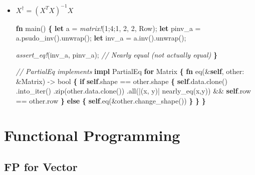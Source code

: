 \documentclass[]{book}
\newenvironment{Shaded}{\begin{snugshade}}{\end{snugshade}}
\newcommand{\BuiltInTok}[1]{#1}
\newcommand{\CommentTok}[1]{\textcolor[rgb]{0.56,0.35,0.01}{\textit{#1}}}
\newcommand{\DataTypeTok}[1]{\textcolor[rgb]{0.13,0.29,0.53}{#1}}
\newcommand{\DecValTok}[1]{\textcolor[rgb]{0.00,0.00,0.81}{#1}}
\newcommand{\KeywordTok}[1]{\textcolor[rgb]{0.13,0.29,0.53}{\textbf{#1}}}
\newcommand{\NormalTok}[1]{#1}
\newcommand{\OperatorTok}[1]{\textcolor[rgb]{0.81,0.36,0.00}{\textbf{#1}}}
\newcommand{\PreprocessorTok}[1]{\textcolor[rgb]{0.56,0.35,0.01}{\textit{#1}}}
\begin{document}
\begin{itemize}
\item
  \(X^\dagger = \left(X^T X\right)^{-1} X\)

\begin{Shaded}
\begin{Highlighting}[]
\KeywordTok{fn}\NormalTok{ main() }\OperatorTok{\{}
    \KeywordTok{let}\NormalTok{ a = }\PreprocessorTok{matrix!}\NormalTok{(}\DecValTok{1}\NormalTok{;}\DecValTok{4}\NormalTok{;}\DecValTok{1}\NormalTok{, }\DecValTok{2}\NormalTok{, }\DecValTok{2}\NormalTok{, Row);}
    \KeywordTok{let}\NormalTok{ pinv_a = a.psudo_inv().unwrap();}
    \KeywordTok{let}\NormalTok{ inv_a = a.inv().unwrap();}

    \PreprocessorTok{assert_eq!}\NormalTok{(inv_a, pinv_a); }\CommentTok{// Nearly equal (not actually equal)}
\OperatorTok{\}}

\CommentTok{// PartialEq implements}
\KeywordTok{impl} \BuiltInTok{PartialEq} \KeywordTok{for}\NormalTok{ Matrix }\OperatorTok{\{}
    \KeywordTok{fn}\NormalTok{ eq(&}\KeywordTok{self}\NormalTok{, other: &Matrix) -> }\DataTypeTok{bool} \OperatorTok{\{}
        \KeywordTok{if} \KeywordTok{self}\NormalTok{.shape == other.shape }\OperatorTok{\{}
            \KeywordTok{self}\NormalTok{.data.clone()}
\NormalTok{                .into_iter()}
\NormalTok{                .zip(other.data.clone())}
\NormalTok{                .all(|(x, y)| nearly_eq(x,y)) && }\KeywordTok{self}\NormalTok{.row == other.row}
        \OperatorTok{\}} \KeywordTok{else} \OperatorTok{\{}
            \KeywordTok{self}\NormalTok{.eq(&other.change_shape())}
        \OperatorTok{\}}
    \OperatorTok{\}}
\OperatorTok{\}}
\end{Highlighting}
\end{Shaded}
\end{itemize}

\hypertarget{functional}{%
\chapter{Functional Programming}\label{functional}}

\hypertarget{fp-for-vector}{%
\section{FP for Vector}\label{fp-for-vector}}
\end{document}
